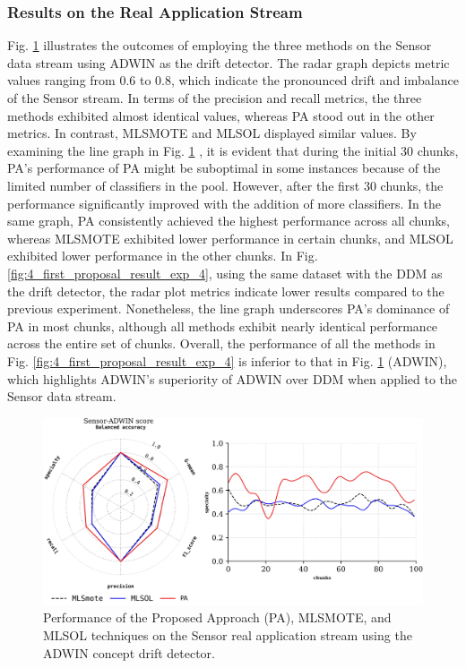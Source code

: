 \subsubsection{Results on the Real Application Stream}
Fig. \ref{fig:4_first_proposal_result_exp_3} illustrates the outcomes of employing the three methods on the Sensor data stream using ADWIN as the drift detector. The radar graph depicts metric values ranging from 0.6 to 0.8, which indicate the pronounced drift and imbalance of the Sensor stream. In terms of the precision and recall metrics, the three methods exhibited almost identical values, whereas PA stood out in the other metrics. In contrast, MLSMOTE and MLSOL displayed similar values. By examining the line graph in Fig. \ref{fig:4_first_proposal_result_exp_3}
, it is evident that during the initial 30 chunks, PA's performance of PA might be suboptimal in some instances because of the limited number of classifiers in the pool. However, after the first 30 chunks, the performance significantly improved with the addition of more classifiers. In the same graph, PA consistently achieved the highest performance across all chunks, whereas MLSMOTE exhibited lower performance in certain chunks, and MLSOL exhibited lower performance in the other chunks. In Fig. \ref{fig:4_first_proposal_result_exp_4}, using the same dataset with the DDM as the drift detector, the radar plot metrics indicate lower results compared to the previous experiment. Nonetheless, the line graph underscores PA's dominance of PA in most chunks, although all methods exhibit nearly identical performance across the entire set of chunks. Overall, the performance of all the methods in Fig. \ref{fig:4_first_proposal_result_exp_4} is inferior to that in Fig. \ref{fig:4_first_proposal_result_exp_3} (ADWIN), which highlights ADWIN's superiority of ADWIN over DDM when applied to the Sensor data stream. 


\begin{figure}[!ht]
	\centering
	\includegraphics[width=1\linewidth]{4_Imbalanced/figures/exp_3.png}
  \caption{Performance of the Proposed Approach (PA), MLSMOTE, and MLSOL techniques on the Sensor real application stream using the ADWIN concept drift detector.}
	\label{fig:4_first_proposal_result_exp_3}
\end{figure}

